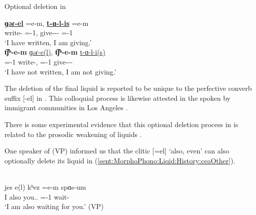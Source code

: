 \begin{exe}
	\ex Optional deletion in {\seaCEA}\label{sent:MorphoPhono:Liqid:History:cea}
	\begin{xlist}
		\ex \gll \textbf{\uline{ɡəɾ-el}} \colorbox{lsLightGray}{=e-m}, \textbf{\uline{t-ɑ-l-is}} \colorbox{lsLightGray}{=e-m}
		\\
		write-{\perfcvb} ={\auxgloss}-1{\sg}, give-{\thgloss}-{\infgloss}-{\impfcvb} ={\auxgloss}-1{\sg}
		\\
		\trans `I have written, I am giving.'
		\\
		\ex \gll \textbf{t͡ʃʰ\colorbox{lsLightGray}{-e-m}} \uline{ɡəɾ-e(l)}, \textbf{t͡ʃʰ\colorbox{lsLightGray}{-e-m}} \uline{t-ɑ-l-i(s)}  
		\\
		{\neggloss}={\auxgloss}-1{\sg} write-{\perfcvb}, {\neggloss}={\auxgloss}-1{\sg} give-{\thgloss}-{\infgloss}-{\impfcvb}  
		\\
		\trans `I have not written, I am not giving.'
		\\
	\end{xlist}
\end{exe}

The deletion of the final liquid   is reported to be unique to the perfective converb suffix  [-el] in {\seaCEA}. This colloquial process is likewise attested in the {\seaCEA}   spoken by immigrant communities in Los Angeles  \citep[72]{Karapetian-2014-TeachArmenianEasternArmenianHeritage}. 


There is some experimental evidence   that this optional deletion process in {\seaCEA} is related to   the prosodic weakening of liquids \citep{grigoryan-2018-FallOfLiquidLPastParticipleInversionSpokenLanguage}.  


One speaker of {\seaCEAAbbre} (VP)    informed us that the clitic [=el] `also, even' can also optionally delete its liquid in {\seaCEAAbbre} (\ref{sent:MorphoPhono:Liqid:History:ceaOther}). 

\begin{exe}
	\ex {\seaCEA}\\ \gll jes e(l) kʰez =e-m spɑs-um 
	\\
	I also you.{\sg}.{\dat} ={\auxgloss}-1{\sg} wait-{\impfcvb}
	\\
	\trans `I am also waiting for you.' \hfill (VP) \label{sent:MorphoPhono:Liqid:History:ceaOther}
	\\
\end{exe}


